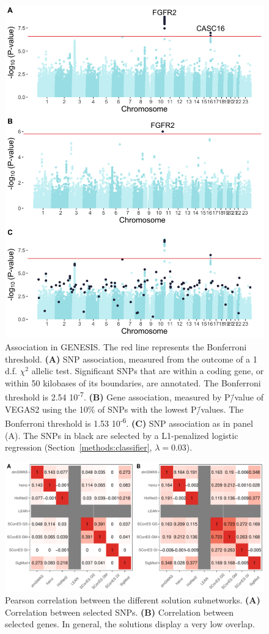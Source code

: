 \documentclass[10pt,letterpaper]{article}
\begin{document}
\begin{figure}[htbp]
  \centering
  \includegraphics[width=.7\linewidth]{./figures/sfigure_2.png}
  \caption{Association in GENESIS. The red line represents the Bonferroni threshold. \textbf{(A)} SNP association, measured from the outcome of a 1 d.f. $\chi^2$ allelic test. Significant SNPs that are within a coding gene, or within 50 kilobases of its boundaries, are annotated. The Bonferroni threshold is 2.54 \texttimes{} 10\textsuperscript{-7}. \textbf{(B)} Gene association, measured by P\=/value of VEGAS2 \cite{mishra_vegas2:_2015} using the 10\% of SNPs with the lowest P\=/values. The Bonferroni threshold is 1.53 \texttimes{} 10\textsuperscript{-6}. \textbf{(C)} SNP association as in panel (A). The SNPs in black are selected by a L1-penalized logistic regression (Section~\ref{methods:classifier}, $\lambda = 0.03$).}
  \label{sfig:snp_gene_manhattan}
\end{figure}

\begin{figure}[htbp]
\centering
\includegraphics[width=.9\linewidth]{./figures/sfigure_3.pdf}
\caption{Pearson correlation between the different solution subnetworks. \textbf{(A)} Correlation between selected SNPs. \textbf{(B)} Correlation between selected genes. In general, the solutions display a very low overlap.}
\label{sfig:pearson_methods}
\end{figure}
\end{document}

